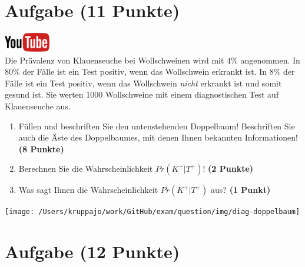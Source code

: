 \documentclass[a4paper, 10pt]{scrartcl}\usepackage[]{graphicx}\usepackage[]{xcolor}
\begin{document}
\clearpage

\section{Aufgabe \hfill (11 Punkte)}

\hfill\href{https://youtu.be/VQlNl8hvRII}{\includegraphics[width =
  2cm]{img/youtube}}\\[1Ex]


Die Pr{\"a}valenz von Klauenseuche bei Wollschweinen wird mit
4\% angenommen. In 80\% der F{\"a}lle ist ein Test positiv, wenn das Wollschwein erkrankt
ist. In 8\% der F{\"a}lle ist ein Test positiv,
wenn das Wollschwein \textit{nicht} erkrankt ist und somit gesund ist. Sie
werten 1000 Wollschweine mit einem
diagnostischen Test auf Klauenseuche aus.



\begin{enumerate}
\item F{\"u}llen und beschriften Sie den untenstehenden Doppelbaum! Beschriften
  Sie auch die {\"A}ste des Doppelbaumes, mit denen Ihnen bekannten
  Informationen!  \textbf{(8 Punkte)}
\item Berechnen Sie die Wahrscheinlichkeit $Pr(K^+|T^+)$! \textbf{(2 Punkte)}
\item Was sagt Ihnen die Wahrscheinlichkeit $Pr(K^+|T^+)$ aus? \textbf{(1 Punkt)}
\end{enumerate}

\vspace{1cm}

\begin{center}
  \texttt{[image: /Users/kruppajo/work/GitHub/exam/question/img/diag-doppelbaum]}
\end{center}



 
\clearpage

\section{Aufgabe \hfill (12 Punkte)}
\end{document}
